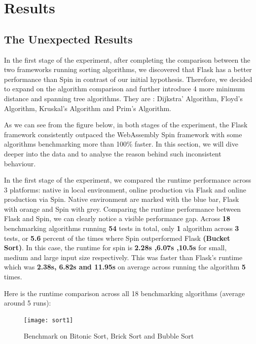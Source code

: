 \chapter{Results} \label{chap:results}

\bigskip
\section{The Unexpected Results}

In the first stage of the experiment, after completing the comparison between the two frameworks running sorting algorithms, we discovered that Flask has a better performance than Spin in contrast of our initial hypothesis. Therefore, we decided to expand on the algorithm comparison and further introduce 4 more minimum distance and spanning tree algorithms. They are : Dijkstra' Algorithm, Floyd's Algorithm, Kruskal's Algorithm and Prim's Algorithm.

As we can see from the figure below, in both stages of the experiment, the Flask framework consistently outpaced the WebAssembly Spin framework with some algorithms benchmarking more than 100\% faster. In this section, we will dive deeper into the data and to analyse the reason behind such inconsistent behaviour.

In the first stage of the experiment, we compared the runtime performance across 3 platforms: native in local environment, online production via Flask and online production via Spin. Native environment are marked with the blue bar, Flask with orange and Spin with grey. Comparing the runtime performance between Flask and Spin, we can clearly notice a visible performance gap. Across \textbf{18} benchmarking algorithms running \textbf{54} tests in total, only \textbf{1} algorithm across \textbf{3} tests, or \textbf{5.6} percent of the times where Spin outperformed Flask \textbf{(Bucket Sort)}. In this case, the runtime for spin is \textbf{2.28s ,6.07s ,10.5s} for small, medium and large input size respectively. This was faster than Flask's runtime which was \textbf{2.38s, 6.82s and 11.95s} on average across running the algorithm \textbf{5} times.

Here is the runtime comparison across all 18 benchmarking algorithms (average around 5 runs):

\newpage
\bigskip
\begin{figure}[hp]
\centering
\texttt{[image: sort1]}
\caption{\footnotesize{Benchmark on Bitonic Sort, Brick Sort and Bubble Sort}}
\captionsetup{aboveskip=0pt,font=it}
\end{figure}
\bigskip

